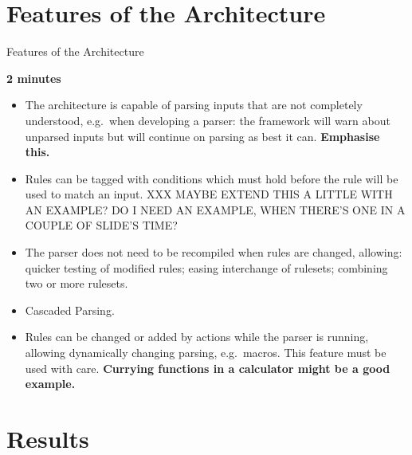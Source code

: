 \documentclass{beamer}
\newcommand{\timingnote}[1]{%
    \textbf{#1}%
}
\begin{document}
\section{Features of the Architecture}

\begin{frame}{Features of the Architecture}

    \timingnote{2 minutes}

    \begin{itemize}

        \item The architecture is capable of parsing inputs that are not
            completely understood, e.g.\ when developing a parser: the
            framework will warn about unparsed inputs but will continue on
            parsing as best it can.  \timingnote{Emphasise this.}

        \item Rules can be tagged with conditions which must hold before
            the rule will be used to match an input.  XXX MAYBE EXTEND THIS
            A LITTLE WITH AN EXAMPLE\@?  DO I NEED AN EXAMPLE, WHEN THERE'S
            ONE IN A COUPLE OF SLIDE'S TIME\@?

        \item The parser does not need to be recompiled when rules are
            changed, allowing: quicker testing of modified rules; easing
            interchange of rulesets; combining two or more rulesets.

        \item Cascaded Parsing.

        \item Rules can be changed or added by actions while the parser is
            running, allowing dynamically changing parsing, e.g.\ macros.
            This feature must be used with care.  \timingnote{Currying
            functions in a calculator might be a good example.}

    \end{itemize}

\end{frame}


\section{Results}
\end{document}
